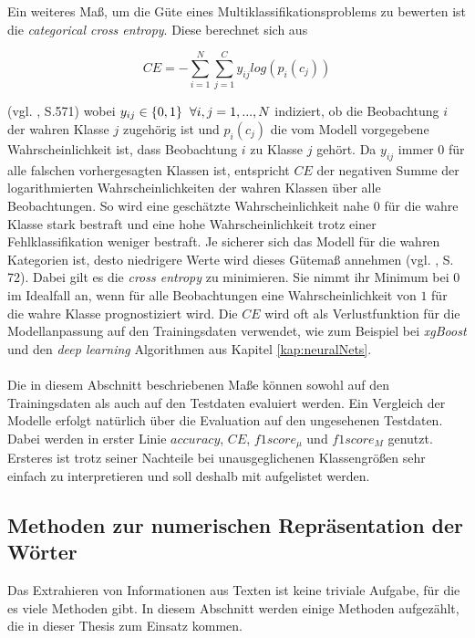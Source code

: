 \documentclass[a4paper,11pt]{article}
\begin{document}
Ein weiteres Maß, um die Güte eines Multiklassifikationsproblems zu bewerten ist die \textit{categorical cross entropy}. Diese berechnet sich aus

\[ CE = -\sum_{i=1}^N \sum_{j = 1}^C y_{ij} log(p_i(c_j)) \]

(vgl. \cite{murphy}, S.571) wobei $y_{ij} \in \{0,1\} \hspace{0.2cm} \forall i, j = 1,...,N$ indiziert, ob die Beobachtung $i$ der wahren Klasse $j$ zugehörig ist und $p_i(c_j)$ die vom Modell vorgegebene Wahrscheinlichkeit ist, dass Beobachtung $i$ zu Klasse $j$ gehört. Da $y_{ij}$ immer $0$ für alle falschen vorhergesagten Klassen ist, entspricht $CE$ der negativen Summe der logarithmierten Wahrscheinlichkeiten der wahren Klassen über alle Beobachtungen. So wird eine geschätzte Wahrscheinlichkeit nahe $0$ für die wahre Klasse stark bestraft und eine hohe Wahrscheinlichkeit trotz einer Fehlklassifikation weniger bestraft. Je sicherer sich das Modell für die wahren Kategorien ist, desto niedrigere Werte wird dieses Gütemaß annehmen (vgl. \cite{proMachine}, S. 72). 
Dabei gilt es die \textit{cross entropy} zu minimieren. Sie nimmt ihr Minimum bei $0$ im Idealfall an, wenn für alle Beobachtungen eine Wahrscheinlichkeit von $1$ für die wahre Klasse prognostiziert wird. Die $CE$ wird oft als Verlustfunktion für die Modellanpassung auf den Trainingsdaten verwendet, wie zum Beispiel bei \textit{xgBoost} und den \textit{deep learning} Algorithmen aus Kapitel \ref{kap:neuralNets}.\\
\\
Die in diesem Abschnitt beschriebenen Maße können sowohl auf den Trainingsdaten als auch auf den Testdaten evaluiert werden. Ein Vergleich der Modelle erfolgt natürlich über die Evaluation auf den ungesehenen Testdaten. Dabei werden in erster Linie $accuracy$, $CE$, $f1score_\mu$ und $f1score_M$ genutzt. Ersteres ist trotz seiner Nachteile bei unausgeglichenen Klassengrößen sehr einfach zu interpretieren und soll deshalb mit aufgelistet werden.


\subsection{Methoden zur numerischen Repräsentation der Wörter} \label{kap:3.1Wordemb}

Das Extrahieren von Informationen aus Texten ist keine triviale Aufgabe, für die es viele Methoden gibt. In diesem Abschnitt werden einige Methoden aufgezählt, die in dieser Thesis zum Einsatz kommen.
\end{document}
